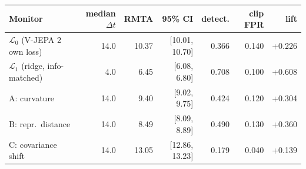 \begin{tabular}{lrrrrrr}
\toprule
Monitor & median $\Delta t$ & RMTA & 95\% CI & detect. & clip FPR & lift \\
\midrule
$\mathcal{L}_0$ (V-JEPA 2 own loss) & 14.0 & 10.37 & [10.01, 10.70] & 0.366 & 0.140 & +0.226 \\
$\mathcal{L}_1$ (ridge, info-matched) & 4.0 & 6.45 & [6.08, 6.80] & 0.708 & 0.100 & +0.608 \\
\midrule
$\mathrm{A}$: curvature & 14.0 & 9.40 & [9.02, 9.75] & 0.424 & 0.120 & +0.304 \\
$\mathrm{B}$: repr.\ distance & 14.0 & 8.49 & [8.09, 8.89] & 0.490 & 0.130 & +0.360 \\
$\mathrm{C}$: covariance shift & 14.0 & 13.05 & [12.86, 13.23] & 0.179 & 0.040 & +0.139 \\
\bottomrule
\end{tabular}
